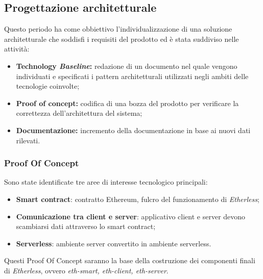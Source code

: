 \subsection{Progettazione architetturale}
Questo periodo ha come obbiettivo l'individualizzazione di una soluzione architetturale che soddisfi i requisiti del prodotto ed è stata suddiviso nelle attività:
\begin{itemize}
	\item \textbf{Technology \textit{Baseline\glos}:} redazione di un documento nel quale vengono individuati e specificati i pattern architetturali utilizzati negli ambiti delle tecnologie coinvolte;
	\item  \textbf{Proof of concept:} codifica di una bozza del prodotto per verificare la correttezza dell'architettura del sistema;
	\item \textbf{Documentazione:} incremento della documentazione in base ai nuovi dati rilevati.
\end{itemize}
\subsubsection{Proof Of Concept}
Sono state identificate tre aree di interesse tecnologico principali:
\begin{itemize}
	\item \textbf{Smart contract}: contratto Ethereum\glo, fulcro del funzionamento di \textit{Etherless};
	\item \textbf{Comunicazione tra client e server}: applicativo client e server devono scambiarsi dati attraverso lo smart contract;
	\item \textbf{Serverless\glo}: ambiente server convertito in ambiente serverless\glos.
\end{itemize}
Questi Proof Of Concept saranno la base della costruzione dei componenti finali di \textit{Etherless}, ovvero \textit{eth-smart, eth-client, eth-server}.
